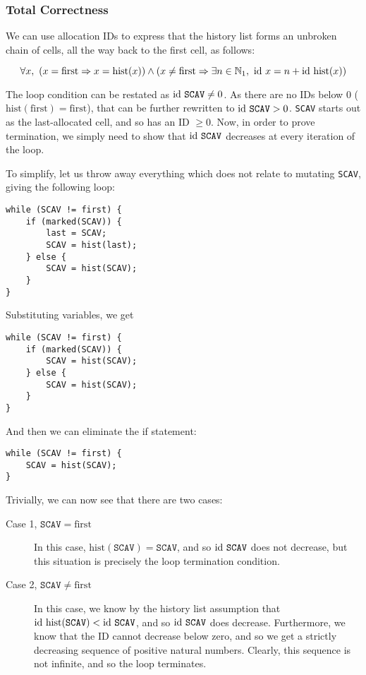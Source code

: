 \subsubsection{Total Correctness}
\label{sec:marksweep-example-total}

We can use allocation IDs to express that the history list forms an
unbroken chain of cells, all the way back to the first cell, as
follows:

\[\forall x,\ \left(x = \mathrm{first} \Rightarrow x =
  \mathrm{hist}(x)\right) \land \left(x \neq \mathrm{first} \Rightarrow
  \exists n \in \mathbb N_{1},\ \mathrm{id}~x = n +
  \mathrm{id}~\mathrm{hist}(x)\right)\]

The loop condition can be restated as $\mathrm{id}~\mathtt{SCAV} \neq 0$. As
there are no IDs below 0 ($\mathrm{hist}(\mathrm{first}) =
\mathrm{first}$), that can be further rewritten to $\mathrm{id}~\mathtt{SCAV}
> 0$. \texttt{SCAV} starts out as the last-allocated cell, and so has
an ID $\geq 0$. Now, in order to prove termination, we simply need to
show that $\mathrm{id}~\mathtt{SCAV}$ decreases at every iteration of the
loop.

To simplify, let us throw away everything which does not relate to
mutating \texttt{SCAV}, giving the following loop:

\begin{lstlisting}
while (SCAV != first) {
    if (marked(SCAV)) {
        last = SCAV;
        SCAV = hist(last);
    } else {
        SCAV = hist(SCAV);
    }
}
\end{lstlisting}

Substituting variables, we get

\begin{lstlisting}
while (SCAV != first) {
    if (marked(SCAV)) {
        SCAV = hist(SCAV);
    } else {
        SCAV = hist(SCAV);
    }
}
\end{lstlisting}

And then we can eliminate the if statement:

\begin{lstlisting}
while (SCAV != first) {
    SCAV = hist(SCAV);
}
\end{lstlisting}

Trivially, we can now see that there are two cases:

\begin{description}
  \item[Case 1, $\mathtt{SCAV} = \mathrm{first}$] In this case,
    $\mathrm{hist}(\mathtt{SCAV}) = \mathtt{SCAV}$, and so
    $\mathrm{id}~\mathtt{SCAV}$ does not decrease, but this situation is
    precisely the loop termination condition.

  \item[Case 2, $\mathtt{SCAV} \neq \mathrm{first}$] In this case, we
    know by the history list assumption that
    $\mathrm{id}~\mathrm{hist}(\mathtt{SCAV}) < \mathrm{id}~\mathtt{SCAV}$, and so
    $\mathrm{id}~\mathtt{SCAV}$ does decrease. Furthermore, we know that the
    ID cannot decrease below zero, and so we get a strictly decreasing
    sequence of positive natural numbers. Clearly, this sequence is
    not infinite, and so the loop terminates.
\end{description}

